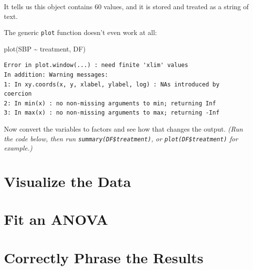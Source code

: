 \documentclass[
]{book}
\newenvironment{Shaded}{\begin{snugshade}}{\end{snugshade}}
\newcommand{\FunctionTok}[1]{\textcolor[rgb]{0.00,0.00,0.00}{#1}}
\newcommand{\NormalTok}[1]{#1}
\newcommand{\OtherTok}[1]{\textcolor[rgb]{0.56,0.35,0.01}{#1}}
\newcommand{\SpecialCharTok}[1]{\textcolor[rgb]{0.00,0.00,0.00}{#1}}
\begin{document}
It tells us this object contains 60 values, and it is stored and treated as a string of text.

The generic \texttt{plot} function doesn't even work at all:

\begin{Shaded}
\begin{Highlighting}[]
\FunctionTok{plot}\NormalTok{(SBP }\SpecialCharTok{\textasciitilde{}}\NormalTok{ treatment, DF)}
\end{Highlighting}
\end{Shaded}

\begin{verbatim}
Error in plot.window(...) : need finite 'xlim' values
In addition: Warning messages:
1: In xy.coords(x, y, xlabel, ylabel, log) : NAs introduced by coercion
2: In min(x) : no non-missing arguments to min; returning Inf
3: In max(x) : no non-missing arguments to max; returning -Inf
\end{verbatim}

Now convert the variables to factors and see how that changes the output. \emph{(Run the code below, then run \texttt{summary(DF\$treatment)}, or \texttt{plot(DF\$treatment)} for example.)}

\begin{Shaded}
\end{Shaded}

\hypertarget{vis-ANOVA}{%
\section{Visualize the Data}\label{vis-ANOVA}}

\hypertarget{fit-an-anova}{%
\section{Fit an ANOVA}\label{fit-an-anova}}

\hypertarget{results-ANOVA}{%
\section{Correctly Phrase the Results}\label{results-ANOVA}}
\end{document}
